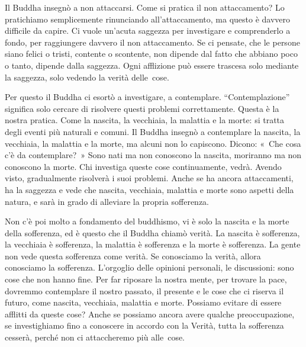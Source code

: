 Il Buddha insegnò a non attaccarsi. Come si pratica il non attaccamento?
Lo pratichiamo semplicemente rinunciando all'attaccamento, ma questo è
davvero difficile da capire. Ci vuole un'acuta saggezza per investigare
e comprenderlo a fondo, per raggiungere davvero il non attaccamento. Se
ci pensate, che le persone siano felici o tristi, contente o scontente,
non dipende dal fatto che abbiano poco o tanto, dipende dalla saggezza.
Ogni afflizione può essere trascesa solo mediante la saggezza, solo
vedendo la verità delle~cose.

Per questo il Buddha ci esortò a investigare, a contemplare.
``Contemplazione'' significa solo cercare di risolvere questi problemi
correttamente. Questa è la nostra pratica. Come la nascita, la
vecchiaia, la malattia e la morte: si tratta degli eventi più naturali e
comuni. Il Buddha insegnò a contemplare la nascita, la vecchiaia, la
malattia e la morte, ma alcuni non lo capiscono. Dicono: «~Che cosa c'è
da contemplare?~» Sono nati ma non conoscono la nascita, moriranno ma
non conoscono la morte. Chi investiga queste cose continuamente, vedrà.
Avendo visto, gradualmente risolverà i suoi problemi. Anche se ha ancora
attaccamenti, ha la saggezza e vede che nascita, vecchiaia, malattia e
morte sono aspetti della natura, e sarà in grado di alleviare la propria
sofferenza.

Non c'è poi molto a fondamento del buddhismo, vi è solo la nascita e la
morte della sofferenza, ed è questo che il Buddha chiamò verità. La
nascita è sofferenza, la vecchiaia è sofferenza, la malattia è
sofferenza e la morte è sofferenza. La gente non vede questa sofferenza
come verità. Se conosciamo la verità, allora conosciamo la sofferenza.
L'orgoglio delle opinioni personali, le discussioni: sono cose che non
hanno fine. Per far riposare la nostra mente, per trovare la pace,
dovremmo contemplare il nostro passato, il presente e le cose che ci
riserva il futuro, come nascita, vecchiaia, malattia e morte. Possiamo
evitare di essere afflitti da queste cose? Anche se possiamo ancora
avere qualche preoccupazione, se investighiamo fino a conoscere in
accordo con la Verità, tutta la sofferenza cesserà, perché non ci
attaccheremo più alle~cose.

